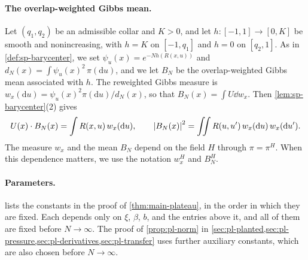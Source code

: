 \paragraph{The overlap-weighted Gibbs mean.}
Let $(q_1,q_2)$ be an admissible collar and $K>0$, and let $h\colon[-1,1]\to[0,K]$ be smooth and nonincreasing, with $h=K$ on $[-1,q_1]$ and $h=0$ on $[q_2,1]$. As in \cref{def:sp-barycenter}, we set $\psi_u(x)=e^{-Nh(R(x,u))}$ and $d_N(x)=\int\psi_u(x)^2\,\pi(\mathrm du)$, and we let $B_N$ be the overlap-weighted Gibbs mean associated with $h$. The reweighted Gibbs measure is $w_x(\mathrm du)=\psi_u(x)^2\pi(\mathrm du)/d_N(x)$, so that $B_N(x)=\int U\dd w_x$. Then \cref{lem:sp-barycenter}(2) gives
\begin{equation}\label{eq:pl-bary}
U(x)\cdot B_N(x)=\int R(x,u)\,w_x(\mathrm du),\qquad
\left|B_N(x)\right|^2=\iint R(u,u')\,w_x(\mathrm du)\,w_x(\mathrm du').
\end{equation}
The measure $w_x$ and the mean $B_N$ depend on the field $H$ through $\pi=\pi^H$. When this dependence matters, we use the notation $w_x^H$ and $B_N^H$.

\paragraph{Parameters.}
 lists the constants in the proof of \cref{thm:main-plateau}, in the order in which they are fixed. Each depends only on $\xi$, $\beta$, $b$, and the entries above it, and all of them are fixed before $N\to\infty$. The proof of \cref{prop:pl-norm} in \cref{sec:pl-planted,sec:pl-pressure,sec:pl-derivatives,sec:pl-transfer} uses further auxiliary constants, which are also chosen before $N\to\infty$.

